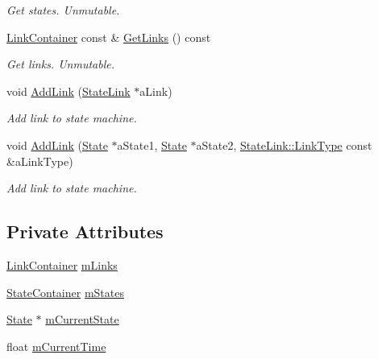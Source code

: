 \begin{DoxyCompactItemize}
\begin{DoxyCompactList}\small\item\em Get states. Unmutable. \end{DoxyCompactList}\item 
\hyperlink{classStateMachine_a48dd36fc36aca328a1d67f17a46bdbb1}{Link\+Container} const \& \hyperlink{classStateMachine_a6e3830c54334e39f72734aaa13479a5d}{Get\+Links} () const 
\begin{DoxyCompactList}\small\item\em Get links. Unmutable. \end{DoxyCompactList}\item 
void \hyperlink{classStateMachine_a703247c50ccc7f2163d6af7d76609a2b}{Add\+Link} (\hyperlink{classStateLink}{State\+Link} $\ast$a\+Link)
\begin{DoxyCompactList}\small\item\em Add link to state machine. \end{DoxyCompactList}\item 
void \hyperlink{classStateMachine_ad5a3e3b2fe13e40c791e14a0cb591378}{Add\+Link} (\hyperlink{classState}{State} $\ast$a\+State1, \hyperlink{classState}{State} $\ast$a\+State2, \hyperlink{classStateLink_a6392f74d9c3ccb368b0e7e57fec62272}{State\+Link\+::\+Link\+Type} const \&a\+Link\+Type)
\begin{DoxyCompactList}\small\item\em Add link to state machine. \end{DoxyCompactList}\end{DoxyCompactItemize}
\subsection*{Private Attributes}
\begin{DoxyCompactItemize}
\item 
\hyperlink{classStateMachine_a48dd36fc36aca328a1d67f17a46bdbb1}{Link\+Container} \hyperlink{classStateMachine_a4161abc2a3b5c4f5301e67fb41de1933}{m\+Links}
\item 
\hyperlink{classStateMachine_aa74dc6c024af439e701f6d97cfa4c8b8}{State\+Container} \hyperlink{classStateMachine_a2fe1471be5c013a4522b1f5548752172}{m\+States}
\item 
\hyperlink{classState}{State} $\ast$ \hyperlink{classStateMachine_ac7a212f64af4572b857db59b3bd501b1}{m\+Current\+State}
\item 
float \hyperlink{classStateMachine_a8f4ff52220811256dfd20daf4a23fb6b}{m\+Current\+Time}
\end{DoxyCompactItemize}


